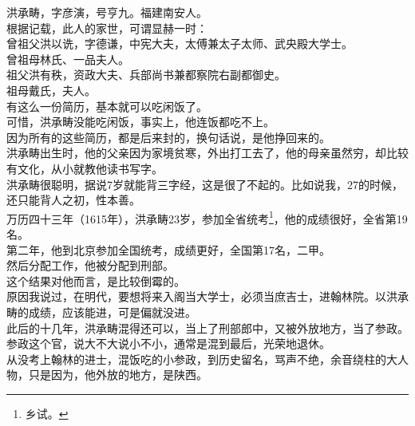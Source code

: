 \begin{multicols}{\theparacolNo}
洪承畴，字彦演，号亨九。福建南安人。\\

根据记载，此人的家世，可谓显赫一时：\\

曾祖父洪以诜，字德谦，中宪大夫，太傅兼太子太师、武央殿大学士。\\

曾祖母林氏、一品夫人。\\

祖父洪有秩，资政大夫、兵部尚书兼都察院右副都御史。\\

祖母戴氏，夫人。\\

有这么一份简历，基本就可以吃闲饭了。\\

可惜，洪承畴没能吃闲饭，事实上，他连饭都吃不上。\\

因为所有的这些简历，都是后来封的，换句话说，是他挣回来的。\\

洪承畴出生时，他的父亲因为家境贫寒，外出打工去了，他的母亲虽然穷，却比较有文化，从小就教他读书写字。\\

洪承畴很聪明，据说7岁就能背三字经，这是很了不起的。比如说我，27的时候，还只能背人之初，性本善。\\

万历四十三年（1615年），洪承畴23岁，参加全省统考\footnote{乡试。}，他的成绩很好，全省第19名。\\

第二年，他到北京参加全国统考，成绩更好，全国第17名，二甲。\\

然后分配工作，他被分配到刑部。\\

这个结果对他而言，是比较倒霉的。\\

原因我说过，在明代，要想将来入阁当大学士，必须当庶吉士，进翰林院。以洪承畴的成绩，应该能进，可是偏就没进。\\

此后的十几年，洪承畴混得还可以，当上了刑部郎中，又被外放地方，当了参政。\\

参政这个官，说大不大说小不小，通常是混到最后，光荣地退休。\\

从没考上翰林的进士，混饭吃的小参政，到历史留名，骂声不绝，余音绕柱的大人物，只是因为，他外放的地方，是陕西。\\


\end{multicols}
